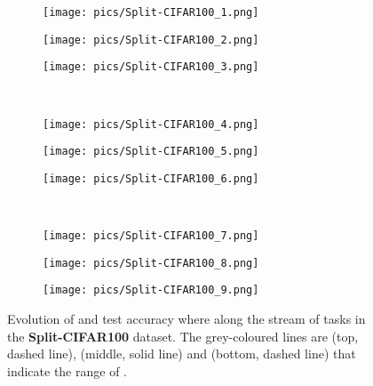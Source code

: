 \documentclass{article} \usepackage{collas2022_conference,times}
\begin{document}
    \begin{figure*}[t!]
        \centering
        \begin{subfigure}[b]{0.32\textwidth}
            \texttt{[image: pics/Split-CIFAR100\_1.png]}\caption{}
        \end{subfigure}
        \hfill
        \begin{subfigure}[b]{0.32\textwidth}
            \texttt{[image: pics/Split-CIFAR100\_2.png]}\caption{}
        \end{subfigure}
        \hfill
        \begin{subfigure}[b]{0.32\textwidth}
            \texttt{[image: pics/Split-CIFAR100\_3.png]}\caption{}
        \end{subfigure}
        \\
        \begin{subfigure}[b]{0.32\textwidth}
            \texttt{[image: pics/Split-CIFAR100\_4.png]}\caption{}
        \end{subfigure}
        \hfill
        \begin{subfigure}[b]{0.32\textwidth}
            \texttt{[image: pics/Split-CIFAR100\_5.png]}\caption{}
        \end{subfigure}
        \hfill
        \begin{subfigure}[b]{0.32\textwidth}
            \texttt{[image: pics/Split-CIFAR100\_6.png]}\caption{}
        \end{subfigure}
        \\
        \begin{subfigure}[b]{0.32\textwidth}
            \texttt{[image: pics/Split-CIFAR100\_7.png]}\caption{}
        \end{subfigure}
        \hfill
        \begin{subfigure}[b]{0.32\textwidth}
            \texttt{[image: pics/Split-CIFAR100\_8.png]}\caption{}
        \end{subfigure}
        \hfill
        \begin{subfigure}[b]{0.32\textwidth}
            \texttt{[image: pics/Split-CIFAR100\_9.png]}\caption{}
        \end{subfigure}
        \caption{Evolution of  and test accuracy  where  along the stream of  tasks in the \textbf{Split-CIFAR100} dataset. The grey-coloured lines are   (top, dashed line),   (middle, solid line) and   (bottom, dashed line) that indicate the range of . }
        \label{alpha_cifar_app}
    \end{figure*}
\end{document}
